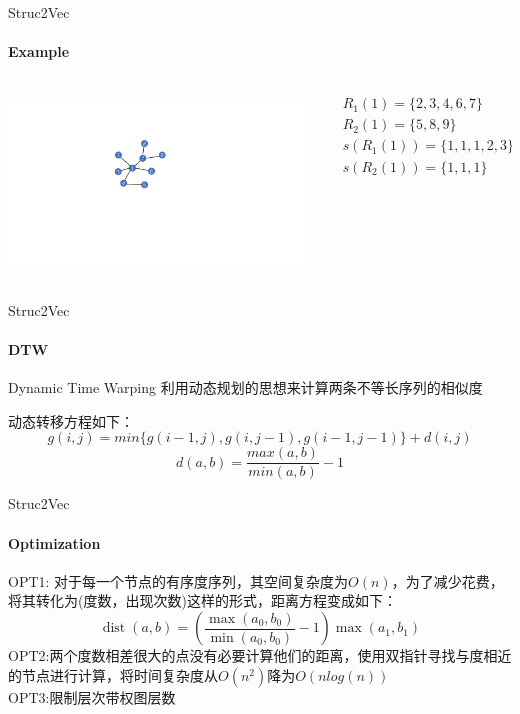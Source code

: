 \documentclass{beamer}
\begin{document}
\begin{frame}{Struc2Vec}
    \framesubtitle{Example}
    \begin{columns}
        \begin{column}{0.5\textwidth}
            \centering\includegraphics[height=4.6cm]{struc2vec_example.pdf}
        \end{column}
        \begin{column}{0.5\textwidth}
            \begin{example}
                \begin{align*}
                    & R_1(1)=\{2,3,4,6,7\} \\
                    & R_2(1)=\{5,8,9\}\\
                    & s(R_1(1))=\{1,1,1,2,3\}\\
                    & s(R_2(1))=\{1,1,1\} \\
                \end{align*}
            \end{example}
        \end{column}
    \end{columns}
\end{frame}
\begin{frame}{Struc2Vec}
    \framesubtitle{DTW}
    \begin{block}{Dynamic Time Warping}
        利用动态规划的思想来计算两条不等长序列的相似度
    \end{block}
    动态转移方程如下：
    $$
    g(i, j) = min\{g(i-1, j),g(i, j-1),g(i-1, j-1)\} + d(i, j)
    $$
    $$d(a, b) = \frac{max(a, b)}{min(a, b)} - 1$$
\end{frame}
\begin{frame}{Struc2Vec}
    \framesubtitle{Optimization}
    OPT1: 对于每一个节点的有序度序列，其空间复杂度为$O(n)$，为了减少花费，将其转化为(度数，出现次数)这样的形式，距离方程变成如下：
    $$
    \operatorname{dist}(a, b)=\left(\frac{\max \left(a_{0}, b_{0}\right)}{\min \left(a_{0}, b_{0}\right)}-1\right) \max \left(a_{1}, b_{1}\right)
    $$
    OPT2:两个度数相差很大的点没有必要计算他们的距离，使用双指针寻找与度相近的节点进行计算，将时间复杂度从$O(n^2)$降为$O(nlog(n))$\\
    OPT3:限制层次带权图层数
\end{frame}
\end{document}
